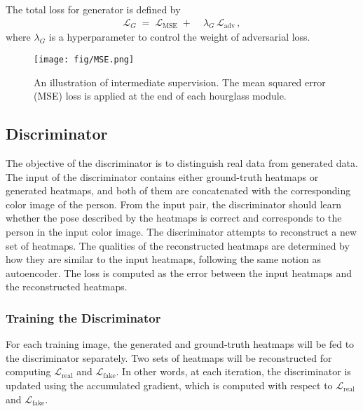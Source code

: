 \documentclass[10pt,twocolumn,letterpaper]{article}
\begin{document}
The total loss for generator is defined by 
\begin{equation}
	\begin{aligned}	
		\mathcal{L}_{G}\;=\; \mathcal{L}_{\mathrm{MSE}} \; + \;&\lambda_{G}\,\mathcal{L}_{\mathrm{adv}}\,,
	\end{aligned}
\end{equation}
where $\lambda_{G}$ is a hyperparameter to control the weight of adversarial loss.


\begin{figure*}[t]
	\centering
	\texttt{[image: fig/MSE.png]}
    \caption{An illustration of intermediate supervision. The mean squared error (MSE) loss is applied at the end of each hourglass module.}
    \label{fig:mse}
\end{figure*}


\subsection{Discriminator}

The objective of the discriminator is to distinguish real data from generated data. The input of the discriminator contains either ground-truth heatmaps or generated heatmaps, and both of them are concatenated with the corresponding color image of the person. From the input pair, the discriminator should learn whether the pose described by the heatmaps is correct and corresponds to the person in the input color image. The discriminator attempts to reconstruct a new set of heatmaps. The qualities of the reconstructed heatmaps are determined by how they are similar to the input heatmaps, following the same notion as autoencoder. The loss is computed as the error between the input heatmaps and the reconstructed heatmaps.


\subsubsection{Training the Discriminator}
For each training image, the generated and ground-truth heatmaps will be fed to the discriminator separately. Two sets of heatmaps will be reconstructed for computing $\mathcal{L}_{\mathrm{real}}$ and $\mathcal{L}_{\mathrm{fake}}$. In other words, at each iteration, the discriminator is updated using the accumulated gradient, which is computed with respect to $\mathcal{L}_{\mathrm{real}}$ and $\mathcal{L}_{\mathrm{fake}}$. 
\end{document}

